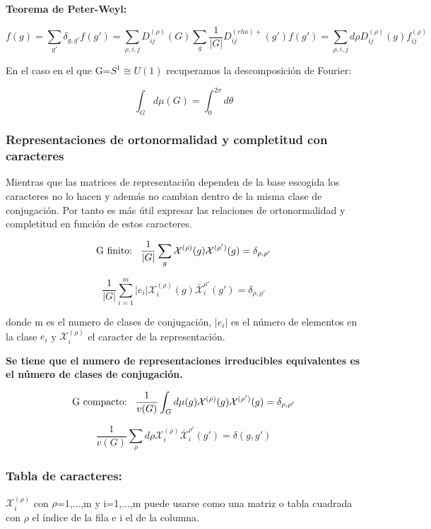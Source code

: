 \documentclass{article}
\begin{document}
\smallskip
\textbf{Teorema de Peter-Weyl:}

$$f(g)=\sum _{g'}\delta _{g,g'}f(g')=\sum _{\rho,i,j}D_{ij}^{(\rho)}(G)\sum _g \frac{1}{|G|}D_{ij}^{(rho)+}(g')f(g')=\sum _{\rho ,i, j} d\rho D_{ij}^{(\rho)}(g)f_{ij}^{(\rho)}$$

\smallskip
En el caso en el que G=$S^1\cong U(1)$ recuperamos la descomposición de Fourier:

$$\int _G d \mu (G)=\int ^{2\pi}_0 d\theta$$

\subsubsection{Representaciones de ortonormalidad y completitud con caracteres}

Mientras que las matrices de representación dependen de la base escogida los caracteres no lo hacen y además no cambian dentro de la misma clase de conjugación. Por tanto es más útil expresar las relaciones de ortonormalidad y completitud en función de estos caracteres.

$$\text{G finito:} \hspace{0.3cm} \frac{1}{|G|}\sum _g\mathcal{X}^{(\rho)}(g)\mathcal{X}^{(\rho ')}(g)=\delta _{\rho , \rho '}$$

$$\frac{1}{|G|}\sum _{i=1}^m |e_i|\mathcal{X}_i^{(\rho)}(g)\bar{\mathcal{X}}_i^{\rho '}(g')=\delta _{\rho , \rho '}$$

donde m es el numero de clases de conjugación, $|e_i|$ es el número de elementos en la clase $e_i$ y $\mathcal{X}_i^{(\rho)}$ el caracter de la representación.

\textbf{Se tiene que el numero de representaciones irreducibles equivalentes es el número de clases de conjugación.}

$$\text{G compacto:} \hspace{0.3cm} \frac{1}{v(G)}\int _G d\mu (g) \mathcal{X}^{(\rho)} (g)\mathcal{X}^{(\rho  ')}(g)=\delta _{\rho , \rho '}$$

$$\frac{1}{v(G)}\sum _\rho d \rho \mathcal{X}_i^{(\rho)} \bar{\mathcal{X}}_i^{\rho'} (g') =\delta (g,g') $$


\subsubsection{Tabla de caracteres:}

\smallskip
$\mathcal{X}_i^{(\rho)}$ con $\rho $=1,...,m y i=1,...,m puede usarse como una matriz o tabla cuadrada con $\rho$ el índice de la fila e i el de la columna.
\end{document}
